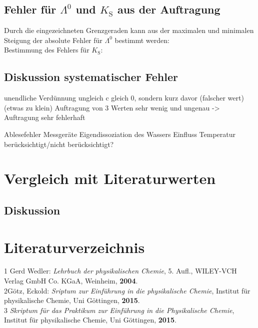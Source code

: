 \documentclass[12pt,a4paper,titlepage,headinclude,bibtotoc]{scrartcl}
\begin{document}
\subsection{Fehler für $\Lambda^0$ und $K_{\mathrm{S}}$ aus der Auftragung}

Durch die eingezeichneten Grenzgeraden kann aus der maximalen und minimalen Steigung der absolute Fehler für $\Lambda^0$ bestimmt werden:\\


Bestimmung des Fehlers für $K_{\mathrm{S}}$:\\


\subsection{Diskussion systematischer Fehler}

unendliche Verdünnung ungleich c gleich 0, sondern kurz davor (falscher wert)(etwas zu klein)
Auftragung von 3 Werten sehr wenig und ungenau -> Auftragung sehr fehlerhaft

Ablesefehler Messgeräte
Eigendissoziation des Wassers
Einfluss Temperatur berücksichtigt/nicht berücksichtigt?



\section{Vergleich mit Literaturwerten}

\subsection{Diskussion}

\newpage

\section{Literaturverzeichnis}
\begin{flushleft}
1 \quad Gerd Wedler: \emph{Lehrbuch der physikalischen Chemie}, 5. Aufl., WILEY-VCH Verlag GmbH Co. KGaA, Weinheim, \textbf{2004}.\\
\vspace{0,5 cm}
2\quad Götz, Eckold: \emph{Sriptum zur Einführung in die physikalische Chemie}, Institut für physikalische Chemie, Uni Göttingen, \textbf{2015}.\\
\vspace{0,5 cm}
3 \quad \emph{Skriptum für das Praktikum zur Einführung in die Physikalische Chemie}, Institut für physikalische Chemie, Uni Göttingen, \textbf{2015}.\\
\end{flushleft}
\end{document}
